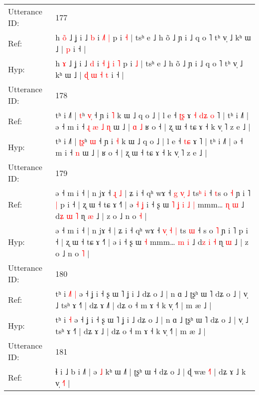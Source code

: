 \documentclass[10pt]{article}
\DeclareRobustCommand{\hl}[1]{{\textcolor{red}{#1}}}
\begin{document}
\begin{longtable}{ll}
\midrule
Utterance ID: & 177 \\
Ref: & h \hl{o}\hl{̃} ˩ ʝ i ˩ \hl{b} i\hl{}\hl{} \hl{}\hl{˩}\hl{˥} \hl{|} p i \hl{˧} | tsʰ e ˩ h õ ˩ ɲ i ˩ q o ˥ tʰ v̩ ˩ kʰ ɯ ˩ |\hl{}\hl{}\hl{}\hl{}\hl{}\hl{} \hl{p} i ˧ |
 \\
Hyp: & h \hl{}\hl{ɤ} ˩ ʝ i ˩ \hl{d} i\hl{ }\hl{˧} \hl{ʝ}\hl{ }\hl{i} \hl{˥} p i \hl{˩} | tsʰ e ˩ h õ ˩ ɲ i ˩ q o ˥ tʰ v̩ ˩ kʰ ɯ ˩ |\hl{ }\hl{ɖ}\hl{ }\hl{ɯ}\hl{ }\hl{˧} \hl{t} i ˧ |
 \\
\midrule
Utterance ID: & 178 \\
Ref: & tʰ i ˩˥ | \hl{}\hl{t}ʰ \hl{v}\hl{̩} ˧ ɲ i \hl{˥} k ɯ ˩ q o ˩ | l e ˧ \hl{ʈ}\hl{ʂ} ɤ\hl{ }\hl{˧}\hl{ }\hl{d}\hl{ʑ}\hl{ }\hl{o} ˥ | tʰ i ˩˥ | ə ˧ m i ˧\hl{ }\hl{ɻ}\hl{ }\hl{æ}\hl{ }\hl{˩} \hl{ɳ} ɯ ˩ |\hl{ }\hl{ɑ}\hl{ }\hl{˩} ʁ o ˧ | ʐ ɯ ˧ tɕ ɤ ˧ k v̩ ˥ z e ˩ |
 \\
Hyp: & tʰ i ˩˥ | \hl{ʈ}\hl{ʂ}ʰ \hl{}\hl{ɯ} ˧ ɲ i \hl{˧} k ɯ ˩ q o ˩ | l e ˧ \hl{t}\hl{ɕ} ɤ\hl{}\hl{}\hl{}\hl{}\hl{}\hl{}\hl{} ˥ | tʰ i ˩˥ | ə ˧ m i ˧\hl{}\hl{}\hl{}\hl{}\hl{}\hl{} \hl{n} ɯ ˩ |\hl{}\hl{}\hl{}\hl{} ʁ o ˧ | ʐ ɯ ˧ tɕ ɤ ˧ k v̩ ˥ z e ˩ |
 \\
\midrule
Utterance ID: & 179 \\
Ref: & ə ˧ m i ˧ | n jɤ ˧\hl{ }\hl{ɻ}\hl{ }\hl{˩} | ʑ i ˧ qʰ wɤ ˧ \hl{g}\hl{ }\hl{v}\hl{̩} \hl{˩} ts\hl{ʰ} \hl{i} ˧ \hl{t}s o \hl{˧} ɲ i ˥\hl{ }\hl{|} p i ˧ | ʐ ɯ ˧ tɕ ɤ ˧˥ | ə\hl{ }\hl{˧}\hl{ }\hl{ʝ} i ˧ ʂ ɯ\hl{ }\hl{˥}\hl{ }\hl{ʝ}\hl{ }\hl{i}\hl{ }\hl{˩} \hl{|} mmm… \hl{ɳ} \hl{ɯ} ˩ d\hl{ʑ} \hl{ɯ} \hl{˥} ɳ \hl{æ} ˩ | z o ˩ n o \hl{˧} |
 \\
Hyp: & ə ˧ m i ˧ | n jɤ ˧\hl{}\hl{}\hl{}\hl{} | ʑ i ˧ qʰ wɤ ˧ \hl{v}\hl{̩}\hl{ }\hl{˧} \hl{|} ts\hl{} \hl{ɯ} ˧ \hl{}s o \hl{˥} ɲ i ˥\hl{}\hl{} p i ˧ | ʐ ɯ ˧ tɕ ɤ ˧˥ | ə\hl{}\hl{}\hl{}\hl{} i ˧ ʂ ɯ\hl{}\hl{}\hl{}\hl{}\hl{}\hl{}\hl{}\hl{} \hl{˧} mmm… \hl{m} \hl{i} ˩ d\hl{z} \hl{i} \hl{˧} ɳ \hl{ɯ} ˩ | z o ˩ n o \hl{˥} |
 \\
\midrule
Utterance ID: & 180 \\
Ref: & tʰ i\hl{ }\hl{˩}\hl{˥} \hl{|} ə ˧ ʝ i ˧ ʂ ɯ ˥ ʝ i ˩ dʑ o ˩ | n ɑ ˩ ʈʂʰ ɯ ˥ dʑ o ˩ | v̩ ˩ tsʰ ɤ ˧˥ | dʑ ɤ ˩\hl{˥} | dʑ o ˧ m ɤ ˧ k v̩ ˧˥ | m æ ˩ |
 \\
Hyp: & tʰ i\hl{}\hl{}\hl{} \hl{˧} ə ˧ ʝ i ˧ ʂ ɯ ˥ ʝ i ˩ dʑ o ˩ | n ɑ ˩ ʈʂʰ ɯ ˥ dʑ o ˩ | v̩ ˩ tsʰ ɤ ˧˥ | dʑ ɤ ˩\hl{} | dʑ o ˧ m ɤ ˧ k v̩ ˧˥ | m æ ˩ |
 \\
\midrule
Utterance ID: & 181 \\
Ref: & ɬ i ˩ b i ˩˥ | ə \hl{˩} kʰ ɯ ˩˥ | ʈʂʰ ɯ ˧ dʑ o ˩ | ɖ wæ \hl{˧}˥ | dʑ ɤ ˩ k v̩ \hl{˧}˥ |

\end{longtable}
\end{document}
